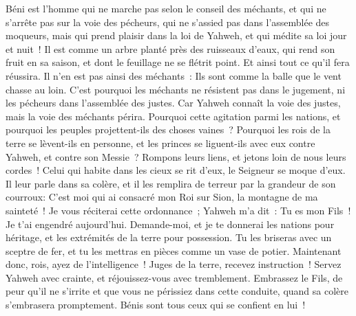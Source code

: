 \begin{multicols}{2}
\VerseOne{}Béni est l'homme qui ne marche pas selon le conseil des méchants, et qui ne s'arrête pas sur la voie des pécheurs, qui ne s'assied pas dans l'assemblée des moqueurs,
mais qui prend plaisir dans la loi de Yahweh, et qui médite sa loi jour et nuit~!
Il est comme un arbre planté près des ruisseaux d'eaux, qui rend son fruit en sa saison, et dont le feuillage ne se flétrit point. Et ainsi tout ce qu'il fera réussira.
Il n'en est pas ainsi des méchants~: Ils sont comme la balle que le vent chasse au loin.
C'est pourquoi les méchants ne résistent pas dans le jugement, ni les pécheurs dans l'assemblée des justes.
Car Yahweh connaît la voie des justes, mais la voie des méchants périra.
\VerseOne{}Pourquoi cette agitation parmi les nations, et pourquoi les peuples projettent-ils des choses vaines~?
Pourquoi les rois de la terre se lèvent-ils en personne, et les princes se liguent-ils avec eux contre Yahweh, et contre son Messie~?
Rompons leurs liens, et jetons loin de nous leurs cordes~!
Celui qui habite dans les cieux se rit d'eux, le Seigneur se moque d'eux.
Il leur parle dans sa colère, et il les remplira de terreur par la grandeur de son courroux:
C'est moi qui ai consacré mon Roi sur Sion, la montagne de ma sainteté~!
Je vous réciterai cette ordonnance~; Yahweh m'a dit~: Tu es mon Fils~! Je t'ai engendré aujourd'hui.
Demande-moi, et je te donnerai les nations pour héritage, et les extrémités de la terre pour possession.
Tu les briseras avec un sceptre de fer, et tu les mettras en pièces comme un vase de potier.
Maintenant donc, rois, ayez de l'intelligence~! Juges de la terre, recevez instruction~!
Servez Yahweh avec crainte, et réjouissez-vous avec tremblement.
Embrassez le Fils, de peur qu'il ne s'irrite et que vous ne périssiez dans cette conduite, quand sa colère s'embrasera promptement. Bénis sont tous ceux qui se confient en lui~!

\end{multicols}
